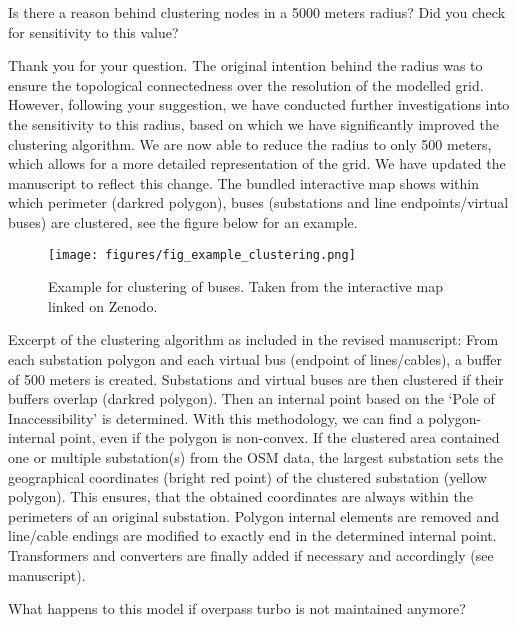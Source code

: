 \documentclass{response}
\begin{document}
\RC Is there a reason behind clustering nodes in a 5000 meters radius? Did you check for sensitivity to this value? 

\AR Thank you for your question. The original intention behind the radius was to ensure the topological connectedness over the resolution of the modelled grid. However, following your suggestion, we have conducted further investigations into the sensitivity to this radius, based on which we have significantly improved the clustering algorithm. We are now able to reduce the radius to only 500 meters, which allows for a more detailed representation of the grid. We have updated the manuscript to reflect this change. The bundled interactive map shows within which perimeter (darkred polygon), buses (substations and line endpoints/virtual buses) are clustered, see the figure below for an example.

\begin{figure}[h]
    \centering
    \texttt{[image: figures/fig\_example\_clustering.png]}
    \caption{Example for clustering of buses. Taken from the interactive map linked on Zenodo. \cite{xiongPrebuiltElectricityNetwork2024}}
    \label{fig:example_clustering}
\end{figure}

Excerpt of the clustering algorithm as included in the revised manuscript: From each substation polygon and each virtual bus (endpoint of lines/cables), a buffer of 500 meters is created. Substations and virtual buses are then clustered if their buffers overlap (darkred polygon). Then an internal point based on the `Pole of Inaccessibility' \cite{garcia-castellanosPolesInaccessibilityCalculation2007} is determined. With this methodology, we can find a polygon-internal point, even if the polygon is non-convex. If the clustered area contained one or multiple substation(s) from the OSM data, the largest substation sets the geographical coordinates (bright red point) of the clustered substation (yellow polygon). This ensures, that the obtained coordinates are always within the perimeters of an original substation. Polygon internal elements are removed and line/cable endings are modified to exactly end in the determined internal point. Transformers and converters are finally added if necessary and accordingly (see manuscript).


\RC What happens to this model if overpass turbo is not maintained anymore? 
\end{document}
